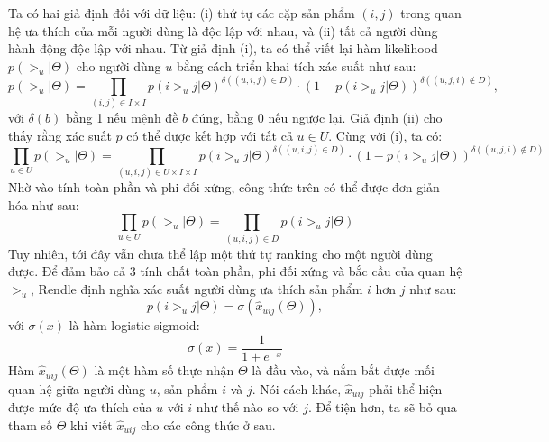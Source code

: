 Ta có hai giả định đối với dữ liệu: (i) thứ tự các cặp sản phẩm $(i, j)$ trong quan hệ ưa thích của mỗi người dùng là độc lập với nhau, và (ii) tất cả người dùng hành động độc lập với nhau. Từ giả định (i), ta có thể viết lại hàm likelihood $p(>_u | \Theta)$ cho người dùng $u$ bằng cách triển khai tích xác suất như sau:
\begin{equation}
    p(>_u | \Theta) = \prod_{(i,j) \in I \times I}{p(i >_u j | \Theta)^{\delta((u,i,j) \in D)} \cdot \left(1 - p(i >_u j | \Theta)\right)^{\delta((u,j,i) \notin D)}},
\end{equation}
với $\delta(b)$ bằng 1 nếu mệnh đề $b$ đúng, bằng 0 nếu ngược lại. Giả định (ii) cho thấy rằng xác suất $p$ có thể được kết hợp với tất cả $u \in U$. Cùng với (i), ta có:
\begin{equation}
    \prod_{u \in U}{p(>_u | \Theta)} = \prod_{(u,i,j) \in U \times I \times I}{p(i >_u j | \Theta)^{\delta((u,i,j) \in D)} \cdot \left(1 - p(i >_u j | \Theta)\right)^{\delta((u,j,i) \notin D)}}
    \label{eq:prod-p}
\end{equation}
Nhờ vào tính toàn phần và phi đối xứng, công thức trên có thể được đơn giản hóa như sau:
\begin{equation}
    \prod_{u \in U}{p(>_u | \Theta)} = \prod_{(u,i,j) \in D}{p(i >_u j | \Theta)}
\end{equation}
Tuy nhiên, tới đây vẫn chưa thể lập một thứ tự ranking cho một người dùng được. Để đảm bảo cả 3 tính chất toàn phần, phi đối xứng và bắc cầu của quan hệ $>_u$, Rendle \cite{BPR-loss} định nghĩa xác suất người dùng ưa thích sản phẩm $i$ hơn $j$ như sau:
\begin{equation}
    p(i >_u j | \Theta) = \sigma(\hat{x}_{uij}(\Theta)),
\end{equation}
với $\sigma(x)$ là hàm logistic sigmoid:
\begin{equation}
    \sigma(x) = \frac{1}{1 + e^{-x}}
\end{equation}
Hàm $\hat{x}_{uij}(\Theta)$ là một hàm số thực nhận $\Theta$ là đầu vào, và nắm bắt được mối quan hệ giữa người dùng $u$, sản phẩm $i$ và $j$. Nói cách khác, $\hat{x}_{uij}$ phải thể hiện được mức độ ưa thích của $u$ với $i$ như thế nào so với $j$. Để tiện hơn, ta sẽ bỏ qua tham số $\Theta$ khi viết $\hat{x}_{uij}$ cho các công thức ở sau.

